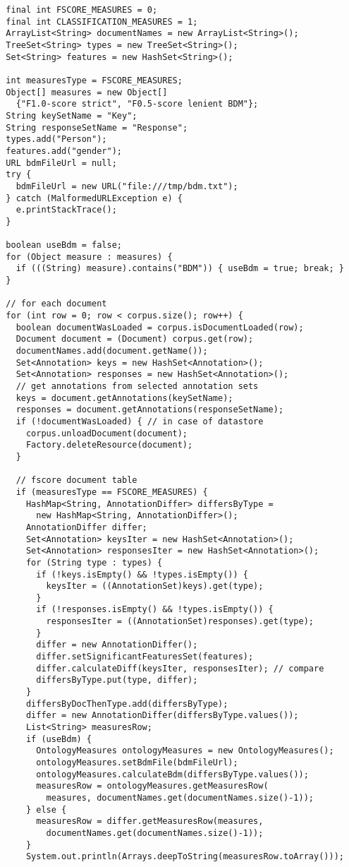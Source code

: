 \begin{lstlisting}
  final int FSCORE_MEASURES = 0;
  final int CLASSIFICATION_MEASURES = 1;
  ArrayList<String> documentNames = new ArrayList<String>();
  TreeSet<String> types = new TreeSet<String>();
  Set<String> features = new HashSet<String>();

  int measuresType = FSCORE_MEASURES;
  Object[] measures = new Object[]
    {"F1.0-score strict", "F0.5-score lenient BDM"};
  String keySetName = "Key";
  String responseSetName = "Response";
  types.add("Person");
  features.add("gender");
  URL bdmFileUrl = null;
  try {
    bdmFileUrl = new URL("file:///tmp/bdm.txt");
  } catch (MalformedURLException e) {
    e.printStackTrace();
  }

  boolean useBdm = false;
  for (Object measure : measures) {
    if (((String) measure).contains("BDM")) { useBdm = true; break; }
  }

  // for each document
  for (int row = 0; row < corpus.size(); row++) {
    boolean documentWasLoaded = corpus.isDocumentLoaded(row);
    Document document = (Document) corpus.get(row);
    documentNames.add(document.getName());
    Set<Annotation> keys = new HashSet<Annotation>();
    Set<Annotation> responses = new HashSet<Annotation>();
    // get annotations from selected annotation sets
    keys = document.getAnnotations(keySetName);
    responses = document.getAnnotations(responseSetName);
    if (!documentWasLoaded) { // in case of datastore
      corpus.unloadDocument(document);
      Factory.deleteResource(document);
    }

    // fscore document table
    if (measuresType == FSCORE_MEASURES) {
      HashMap<String, AnnotationDiffer> differsByType =
        new HashMap<String, AnnotationDiffer>();
      AnnotationDiffer differ;
      Set<Annotation> keysIter = new HashSet<Annotation>();
      Set<Annotation> responsesIter = new HashSet<Annotation>();
      for (String type : types) {
        if (!keys.isEmpty() && !types.isEmpty()) {
          keysIter = ((AnnotationSet)keys).get(type);
        }
        if (!responses.isEmpty() && !types.isEmpty()) {
          responsesIter = ((AnnotationSet)responses).get(type);
        }
        differ = new AnnotationDiffer();
        differ.setSignificantFeaturesSet(features);
        differ.calculateDiff(keysIter, responsesIter); // compare
        differsByType.put(type, differ);
      }
      differsByDocThenType.add(differsByType);
      differ = new AnnotationDiffer(differsByType.values());
      List<String> measuresRow;
      if (useBdm) {
        OntologyMeasures ontologyMeasures = new OntologyMeasures();
        ontologyMeasures.setBdmFile(bdmFileUrl);
        ontologyMeasures.calculateBdm(differsByType.values());
        measuresRow = ontologyMeasures.getMeasuresRow(
          measures, documentNames.get(documentNames.size()-1));
      } else {
        measuresRow = differ.getMeasuresRow(measures,
          documentNames.get(documentNames.size()-1));
      }
      System.out.println(Arrays.deepToString(measuresRow.toArray()));


\end{lstlisting}
